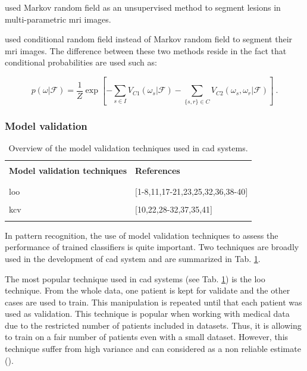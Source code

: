 \begin{enumerate}[leftmargin=*]
\cite{Liu2009,Ozer2010} used Markov random field as an unsupervised method to segment lesions in multi-parametric \ac{mri} images.

\cite{Artan2009,Artan2010} used conditional random field instead of Markov random field to segment their \ac{mri} images. The difference between these two methods reside in the fact that conditional probabilities are used such as:

\begin{equation}
	p(\omega|\mathcal{F}) =  \frac{1}{Z} \exp \left[ - \sum_{s \in I} V_{C1}(\omega_s|\mathcal{F}) - \sum_{\{s,r\} \in C } V_{C2} (\omega_s,\omega_r|\mathcal{F})  \right] \ .
\label{eq:crf}
\end{equation}

\end{enumerate}

\subsubsection{Model validation}

\begin{table}
	\caption{Overview of the model validation techniques used in \ac{cad} systems.}
	\small
	\begin{tabular}{p{.55\linewidth} p{.35\linewidth}}
		\hline \\ [-1.5ex]
		\textbf{Model validation techniques} & \textbf{References} \\ \\ [-1.5ex]
		\hline \\ [-1.5ex]
		\quad \acs{loo} & $[$1-8,11,17-21,23,25,32,36,38-40$]$ \\ \\ [-1.5ex]
		\quad \acs{kcv} & $[$10,22,28-32,37,35,41$]$ \\ \\ [-1.5ex]
		\hline
	\end{tabular}
	\label{tab:valmod}
\end{table}

In pattern recognition, the use of model validation techniques to assess the performance of trained classifiers is quite important. Two techniques are broadly used in the development of \ac{cad} system and are summarized in Tab. \ref{tab:valmod}.

The most popular technique used in \ac{cad} systems (see Tab. \ref{tab:valmod}) is the \acf{loo} technique. From the whole data, one patient is kept for validate and the other cases are used to train. This manipulation is repeated until that each patient was used as validation. This technique is popular when working with medical data due to the restricted number of patients included in datasets. Thus, it is allowing to train on a fair number of patients even with a small dataset. However, this technique suffer from high variance and can considered as a non reliable estimate (\cite{Efron1983}).

